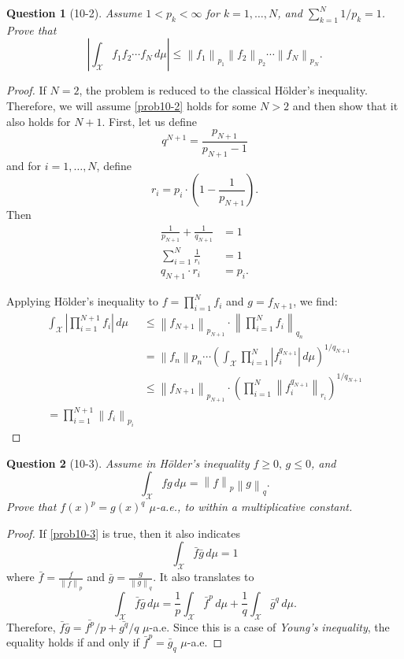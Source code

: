 \documentclass[11pt]{article}
\theoremstyle{quest}
\newtheorem*{question}{Question}
\begin{document}
\begin{question}[10-2]
  Assume $1 < p_{k} < \infty$ for $k=1, \ldots , N$, and $\sum_{k=1}^{N}1/p_{k}=1$. Prove that
  \begin{equation}\label{prob10-2}
    \left| \int_{\mathcal{X}} f_{1}f_{2}\cdots f_{N}\,d\mu \right| \leq \left\|f_{1}\right\|_{p_{1}} \left\|f_{2}\right\|_{p_{2}}\cdots \left\|f_{N}\right\|_{p_{N}}.
  \end{equation}
\end{question}
\begin{proof}
  If $N=2$, the problem is reduced to the classical Hölder's inequality. Therefore, we will assume \ref{prob10-2} holds for some $N > 2$ and then show that it also holds for $N +1$. First, let us define
  $$
    q^{N+1} = \frac{p_{N+1}}{p_{N+1}-1}
  $$
  and for $i = 1, \dots , N$, define
  $$
    r_{i} = p_{i} \cdot \left(1-\frac{1}{p_{N+1}}\right).
  $$
  Then
  \begin{align*}
    \frac{1}{p_{N+1}} + \frac{1}{q_{N+1}} &= 1\\
    \sum_{i=1}^{N}\frac{1}{r_{i}} &= 1\\
    q_{N+1}\cdot r_{i} &= p_{i}.
  \end{align*}

  Applying Hölder's inequality to $f = \prod_{i=1}^{N}f_{i}$ and $g=f_{N+1}$, we find:
  \begin{align}
    \int_{\mathcal{X}}\left|\prod_{i=1}^{N+1}f_{i}\right|\,d\mu &\leq \left\|f_{N+1}\right\|_{p_{N+1}}\cdot \left\|\prod_{i=1}^{N}f_{i}\right\|_{q_{n}}\\
    &= \left\|f_{n}\right\|p_{n} \cdots \left(\int_{\mathcal{X}}\prod_{i=1}^{N}\left|f_{i}^{q_{N+1}}\right| \, d\mu\right)^{1/q_{N+1}}\\
    &\leq \left\|f_{N+1}\right\|_{p_{N+1}}\cdot \left(\prod_{i=1}^{N}\left\|f_{i}^{q_{N+1}}\right\|_{r_{i}}\right)^{1/q_{N+1}}\\
    =\prod_{i=1}^{N+1}\left\|f_{i}\right\|_{p_{i}}
  \end{align}
\end{proof}

\begin{question}[10-3]
  Assume in Hölder's inequality $f \geq 0, \, g \leq 0$, and 
  $$\label{prob10-3}
    \int_{\mathcal{X}}fg\,d\mu = \left\|f\right\|_{p}\left\|g\right\|_{q}.
  $$
  Prove that $f\left(x\right)^{p}=g\left(x\right)^{q}$ $\mu$-a.e., to within a multiplicative constant.
\end{question}
\begin{proof}
  If \ref{prob10-3} is true, then it also indicates
  $$
    \int_{\mathcal{X}}\bar{f}\bar{g}\,d\mu = 1
  $$
  where $\bar{f}=\frac{f}{\left\|f\right\|_{p}}$ and $\bar{g}=\frac{g}{\left\|g\right\|_{q}}$. It also translates to
  $$
    \int_{\mathcal{X}}\bar{f}\bar{g}\,d\mu = \frac{1}{p}\int_{\mathcal{X}}\bar{f}^{p}\,d\mu + \frac{1}{q}\int_{\mathcal{X}}\bar{g}^{q}\,d\mu.
  $$
  Therefore, $\bar{f}\bar{g}=\bar{f^{p}}/p + \bar{g^{q}}/q$ $\mu$-a.e. Since this is a case of \emph{Young's inequality}, the equality holds if and only if $\bar{f}^{p}=\bar{g}_{q}$ $\mu$-a.e. 
\end{proof}
\end{document}
